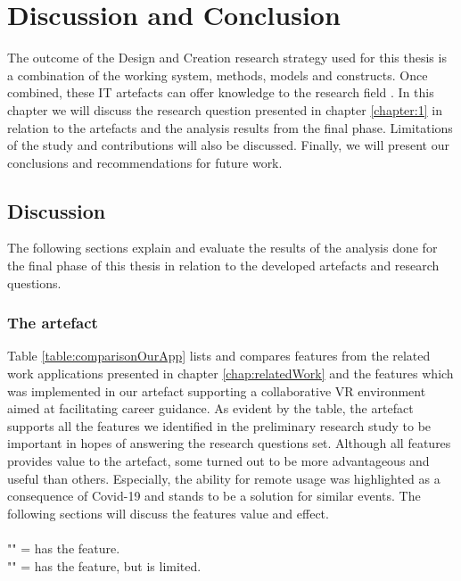 
\chapter{Discussion and Conclusion}
The outcome of the Design and Creation research strategy used for this thesis is a combination of the working system, methods, models and constructs. Once combined, these IT artefacts can offer knowledge to the research field \cite{oates2005researching}. In this chapter we will discuss the research question presented in chapter \ref{chapter:1} in relation to the artefacts and the analysis results from the final phase. Limitations of the study and contributions will also be discussed.
Finally, we will present our conclusions and recommendations for future work.



\section{Discussion}
The following sections explain and evaluate the results of the analysis done for the final phase of this thesis in relation to the developed artefacts and research questions.

\subsection{The artefact} 
Table \ref{table:comparisonOurApp} lists and compares features from the related work applications presented in chapter \ref{chap:relatedWork} and the features which was implemented in our artefact supporting a collaborative VR environment aimed at facilitating career guidance. As evident by the table, the artefact supports all the features we identified in the preliminary research study to be important in hopes of answering the research questions set. Although all features provides value to the artefact, some turned out to be more advantageous and useful than others. Especially, the ability for remote usage was highlighted as a consequence of Covid-19 and stands to be a solution for similar events. 
The following sections will discuss the features value and effect.   
\\
\\ "\ON" = has the feature.
\\ "\LIM" = has the feature, but is limited.

